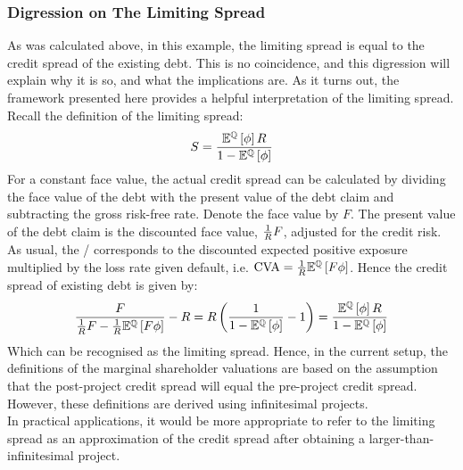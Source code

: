\documentclass[main.tex]{subfiles}
\begin{document}
    \subsubsection*{Digression on The Limiting Spread}

    As was calculated above, in this example,
    the limiting spread is equal to the credit spread of the existing debt.
    This is no coincidence, and this digression will explain why it is so,
    and what the implications are.
    As it turns out, 
    the framework presented here provides a helpful interpretation of the limiting spread.
    \\
    Recall the definition of the limiting spread:
        \begin{equation*}
            S
            =
            \frac{
                \mathbb{E}^{\mathbb{Q}}\left[\phi\right]
                R
            }{
                1
                -
                \mathbb{E}^{\mathbb{Q}}\left[\phi\right]
            }
        \end{equation*}
    For a constant face value,
    the actual credit spread can be calculated by dividing the face value of the debt
    with the present value of the debt claim and subtracting the gross risk-free rate.
    Denote the face value by $F$. 
    The present value of the debt claim is the discounted face value, $\frac{1}{R} F$,
    adjusted for the credit risk. 
    As usual, the \CVA/ corresponds to the discounted expected positive exposure
    multiplied by the loss rate given default, 
    i.e. $\CVA/ = \discountfactor\mathbb{E}^{\rnmeasure}\left[F \phi \right] $.
    Hence the credit spread of existing debt is given by:
        \begin{equation*}
            \frac{
                F
            }{
                \frac{1}{R} F
                -
                \frac{1}{R}
                \mathbb{E}^{\mathbb{Q}}\left[
                    F \phi
                \right] 
            } 
            -
            R
            =
            R \left(
            \frac{
                1
            }{
                    1
                    -
                    \mathbb{E}^{\mathbb{Q}}\left[
                        \phi
                    \right] 
            } 
            - 
            1
            \right)
            =
            \frac{
                \mathbb{E}^{\mathbb{Q}}\left[\phi\right]
                R
            }{
                1
                -
                \mathbb{E}^{\mathbb{Q}}\left[\phi\right]
            }
        \end{equation*}
        Which can be recognised as the limiting spread. 
        Hence, in the current setup, 
        the definitions of the marginal shareholder valuations are based on
        the assumption that the post-project credit spread 
        will equal the pre-project credit spread.
        However, these definitions are derived using infinitesimal projects.
        \\
        In practical applications,
        it would be more appropriate to refer to the limiting spread as an approximation 
        of the credit spread after obtaining a larger-than-infinitesimal project.
        
\end{document}
